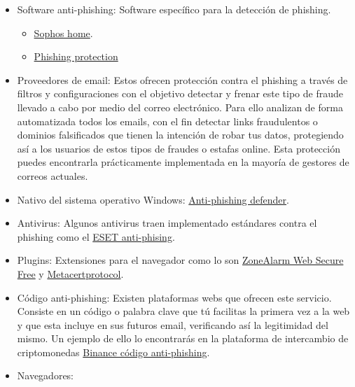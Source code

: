 \documentclass[
  a4paper,
  openany]{book}
\begin{document}
\begin{itemize}
\item
  Software anti-phishing: Software específico para la detección de phishing.

  \begin{itemize}
  \item
    \href{https://home.sophos.com/es-es.aspx}{Sophos home}.
  \item
    \href{https://www.phishprotection.com/}{Phishing protection}
  \end{itemize}
\item
  Proveedores de email: Estos ofrecen protección contra el phishing a través de filtros y configuraciones con el objetivo detectar y frenar este tipo de fraude llevado a cabo por medio del correo electrónico. Para ello analizan de forma automatizada todos los emails, con el fin detectar links fraudulentos o dominios falsificados que tienen la intención de robar tus datos, protegiendo así a los usuarios de estos tipos de fraudes o estafas online. Esta protección puedes encontrarla prácticamente implementada en la mayoría de gestores de correos actuales.
\item
  Nativo del sistema operativo Windows: \href{https://docs.microsoft.com/es-es/office365/servicedescriptions/office-365-advanced-threat-protection-service-description}{Anti-phishing defender}.
\item
  Antivirus: Algunos antivirus traen implementado estándares contra el phishing como el \href{https://support.eset.com/es/kb6380-activar-anti-phishing-en-productos-para-android-de-eset\#enable}{ESET anti-phising}.
\item
  Plugins: Extensiones para el navegador como lo son \href{https://www.zonealarm.com/es/software/web-secure-free}{ZoneAlarm Web Secure Free} y \href{https://metacertprotocol.com/cryptonite}{Metacertprotocol}.
\item
  Código anti-phishing: Existen plataformas webs que ofrecen este servicio. Consiste en un código o palabra clave que tú facilitas la primera vez a la web y que esta incluye en sus futuros email, verificando así la legitimidad del mismo. Un ejemplo de ello lo encontrarás en la plataforma de intercambio de criptomonedas \href{https://academy.binance.com/es/articles/anti-phishing-code}{Binance código anti-phishing}.
\item
  Navegadores:


\end{itemize}
\end{document}
